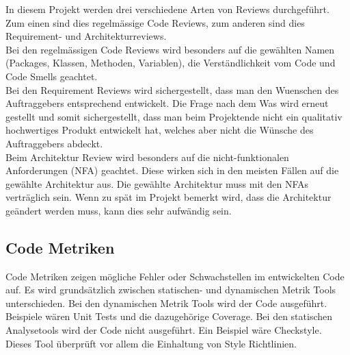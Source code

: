 \noindent In diesem Projekt werden drei verschiedene Arten von Reviews durchgeführt. Zum einen sind dies regelmässige Code Reviews, zum anderen sind dies Requirement- und Architekturreviews.\\

\noindent Bei den regelmässigen Code Reviews wird besonders auf die gewählten Namen (Packages, Klassen, Methoden, Variablen), die Verständlichkeit vom Code und Code Smells geachtet.\\

\noindent Bei den Requirement Reviews wird sichergestellt, dass man den Wuenschen des Auftraggebers entsprechend entwickelt. Die Frage nach dem \glqq Was\grqq{} wird erneut gestellt und somit sichergestellt, dass man beim Projektende nicht ein qualitativ hochwertiges Produkt entwickelt hat, welches aber nicht die Wünsche des Auftraggebers abdeckt.\\ 

\noindent Beim Architektur Review wird besonders auf die nicht-funktionalen Anforderungen (NFA) geachtet. Diese wirken sich in den meisten Fällen auf die gewählte Architektur aus. Die gewählte Architektur muss mit den NFAs verträglich sein. Wenn zu spät im Projekt bemerkt wird, dass die Architektur geändert werden muss, kann dies sehr aufwändig sein.
\subsection{Code Metriken}
Code Metriken zeigen mögliche Fehler oder Schwachstellen im entwickelten Code auf. Es wird grundsätzlich zwischen statischen- und dynamischen Metrik Tools unterschieden. Bei den dynamischen Metrik Tools wird der Code ausgeführt. Beispiele wären Unit Tests und die dazugehörige Coverage. Bei den statischen Analysetools wird der Code nicht ausgeführt. Ein Beispiel wäre Checkstyle. Dieses Tool überprüft vor allem die Einhaltung von Style Richtlinien.\\